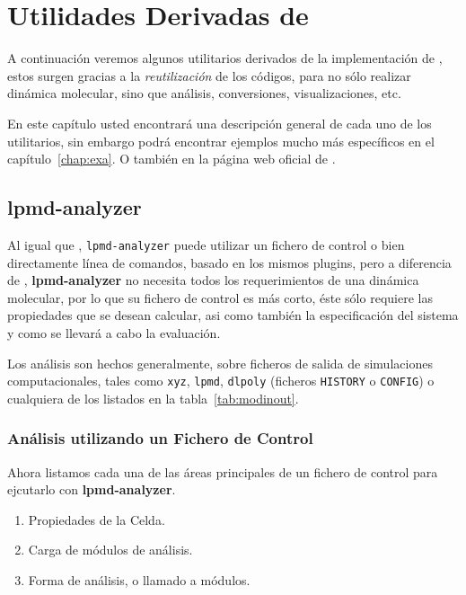 \chapter{Utilidades Derivadas de \lpmd}
\label{chap:utilidades}

A continuaci\'on veremos algunos utilitarios derivados de la implementaci\'on de {\lpmd}, estos surgen gracias a la \textit{reutilizaci\'on} de los c\'odigos, para no s\'olo realizar din\'amica molecular, sino que an\'alisis, conversiones, visualizaciones, etc.

En este cap\'itulo usted encontrar\'a una descripci\'on general de cada uno de los utilitarios, sin embargo podr\'a encontrar ejemplos mucho m\'as espec\'ificos en el cap\'itulo~\ref{chap:exa}. O tambi\'en en la p\'agina web oficial de {\lpmd}.

\section{lpmd-analyzer}

Al igual que {\lpmd}, \verb|lpmd-analyzer| puede utilizar un fichero de control o bien directamente l\'inea de comandos, basado en los mismos plugins, pero a diferencia de {\lpmd}, \textbf{lpmd-analyzer} no necesita todos los requerimientos de una din\'amica molecular, por lo que su fichero de control es m\'as corto, \'este s\'olo requiere las propiedades que se desean calcular, asi como tambi\'en la especificaci\'on del sistema y como se llevar\'a a cabo la evaluaci\'on.

Los an\'alisis son hechos generalmente, sobre ficheros de salida de simulaciones computacionales, tales como \verb|xyz|, \verb|lpmd|, \verb|dlpoly| (ficheros \verb|HISTORY| o \verb|CONFIG|) o cualquiera de los listados en la tabla~\ref{tab:modinout}.

\subsection{An\'alisis utilizando un Fichero de Control}
Ahora listamos cada una de las \'areas principales de un fichero de control para ejcutarlo con \textbf{lpmd-analyzer}.

\begin{enumerate}
 \item Propiedades de la Celda.
 \item Carga de m\'odulos de an\'alisis.
 \item Forma de an\'alisis, o llamado a m\'odulos.
\end{enumerate}

